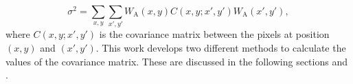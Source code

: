 \begin{equation}\label{eq: variance}
    \sigma^2 = \sum_{x,y}\sum_{x',y'}W_\mathrm{A}(x,y)C(x,y;x',y')W_\mathrm{A}(x',y'),
\end{equation}
where $C(x,y;x',y')$ is the covariance matrix between the pixels at position $(x,y)$ and $(x',y')$. This work develops two different methods to calculate the values of the covariance matrix. These are discussed in the following sections  and .








